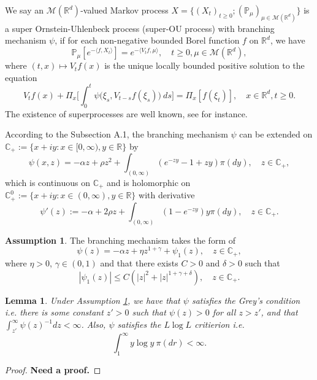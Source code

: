 \documentclass[12pt,a4paper]{amsart}
\theoremstyle{plain}
\newtheorem{lem}[thm]{Lemma}
\theoremstyle{definition}
\newtheorem{asp}{Assumption}
\numberwithin{equation}{section}
\begin{document}
    We say an $\mathcal M(\mathbb R^d)$-valued Markov process $X = \{(X_t)_{t\geq 0}; (\mathbb{P}_{\mu})_{\mu \in \mathcal M(\mathbb R^d)}\}$ is a super Ornstein-Uhlenbeck process (super-OU process) with branching mechanism $\psi$, if for each non-negative bounded Borel function $f$ on $\mathbb R^d$, we have
\begin{equation} \label{super}
    \mathbb{P}_{\mu}[e^{-\langle f,X_t \rangle}]
    = e^{-\langle V_tf, \mu \rangle},
    \quad t\geq 0, \mu \in \mathcal M(\mathbb R^d),
\end{equation}
	where $(t,x) \mapsto V_tf(x)$ is the unique locally bounded positive solution to the equation
\begin{equation}\label{eq1}
	V_tf(x) + \Pi_x \Big[ \int_0^t\psi\big(\xi_s,V_{t-s}f(\xi_s)\big)~ds\Big]
	= \Pi_x [f(\xi_t)],
    \quad x\in \mathbb R^d, t\geq 0.
\end{equation}	
    The existence of superprocesses are well known, see \cite{Dynkin1993Superprocesses} for instance.

    According to the Subsection A.1, the branching mechanism $\psi$ can be extended on $\mathbb C_+:=\{x+iy: x\in [0, \infty), y\in \mathbb R\}$ by
 \[\psi(x,z)=
    - \alpha z + \rho z^2 + \int_{(0,\infty)} (e^{-zy} - 1 + zy) \pi(dy),
    \quad  z \in \mathbb C_+,\]
    which is continuous on $\mathbb C_+$ and is holomorphic on $\mathbb C_+^0:=
    \{x+iy: x\in (0, \infty), y\in \mathbb R\}$ with derivative
\begin{equation}
\label{eq: deriavetive of the Poission part}
    \psi'(z) := -\alpha + 2\rho z+ \int_{(0,\infty)} (1-e^{-zy}) y\pi(dy),
    \quad z\in \mathbb C_+.
\end{equation}

    \begin{asp}
\label{asp: branching mechanism}
    The branching mechanism takes the form of 
\[
    \psi(z) = -\alpha z + \eta z^{1+\gamma} + \psi_1(z),\quad z\in \mathbb C_+,
\]
    where $\eta > 0$, $\gamma \in (0,1)$ and that there exists $C >0$ and $\delta >0$ such that
\[
    |\psi_1(z)| \leq C(|z|^2+|z|^{1+\gamma + \delta}),\quad z\in \mathbb C_+.
\]
\end{asp}

\begin{lem}
    Under Assumption \ref{asp: branching mechanism}, we have that $\psi$ satisfies the Grey's condition i.e. there is some constant $z' > 0$ such that $\psi(z) > 0$ for all $z>z'$, and that $\int_{z'}^\infty \psi(z)^{-1}dz < \infty$. 
    Also, $\psi$ satisfies the $L \log L$ critierion  i.e. 
\[
    \int_1^\infty y \log y~\pi(dr)< \infty.
\]
\end{lem}
\begin{proof}
    {\bf Need a proof.}
\end{proof}
\end{document}
